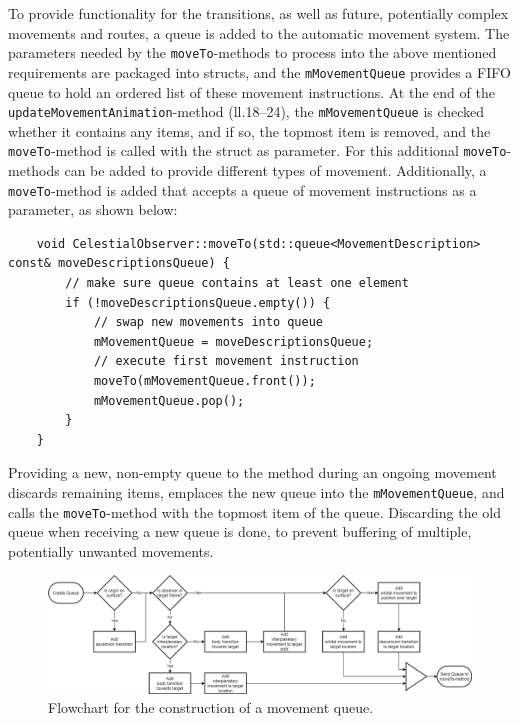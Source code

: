 To provide functionality for the transitions, as well as future, potentially complex movements and routes, a queue is
added to the automatic movement system.
The parameters needed by the \texttt{moveTo}-methods to process into the above mentioned requirements are
packaged into structs, and the \texttt{mMovementQueue} provides a FIFO queue to hold an ordered list of these
movement instructions.
At the end of the \texttt{updateMovementAnimation}-method (ll.\@18--24), the
\texttt{mMovementQueue} is checked whether it contains any items, and if so, the topmost item is removed, and the
\texttt{moveTo}-method is called with the struct as parameter.
For this additional \texttt{moveTo}-methods can be added to provide different types of movement.
Additionally, a \texttt{moveTo}-method is added that accepts a queue of movement instructions as a parameter, as
shown below:
\begin{verbatim}
    void CelestialObserver::moveTo(std::queue<MovementDescription> const& moveDescriptionsQueue) {
        // make sure queue contains at least one element
        if (!moveDescriptionsQueue.empty()) {
            // swap new movements into queue
            mMovementQueue = moveDescriptionsQueue;
            // execute first movement instruction
            moveTo(mMovementQueue.front());
            mMovementQueue.pop();
        }
    }
\end{verbatim}
Providing a new, non-empty queue to the method during an ongoing movement discards remaining items, emplaces the
new queue into the \texttt{mMovementQueue}, and calls the \texttt{moveTo}-method with the topmost item
of the queue.
Discarding the old queue when receiving a new queue is done, to prevent buffering of multiple, potentially unwanted
movements.

\begin{figure}[h]
    \centering
    \includegraphics[width=\textwidth]{content/4_3_autoNavigation/img/QueueConstructionFlowchart}
    \caption{Flowchart for the construction of a movement queue.}
    \label{fig:movement-queue}
\end{figure}

